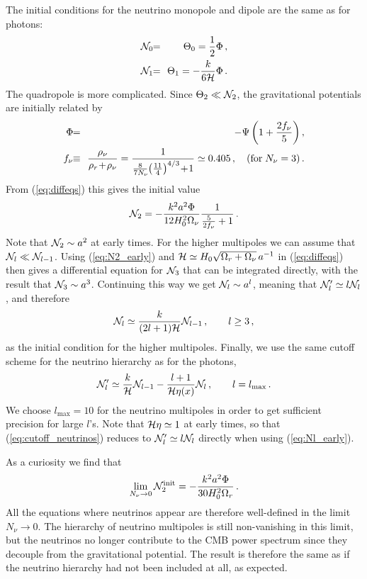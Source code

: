 \documentclass[twocolumn,nofootinbib,amsmath,amssymb]{revtex4}
\newcommand{\be}{\begin{equation}}
\newcommand{\ee}{\end{equation}}
\newcommand{\ba}{\begin{eqnarray}}
\newcommand{\ea}{\end{eqnarray}}
\newcommand{\hs}{\hspace{-1.12mm}}
\newcommand{\eq}{\hs & = & \hs}
\newcommand{\eqequiv}{\hs & \equiv & \hs}
\begin{document}
The initial conditions for the neutrino monopole and dipole are the same as for
photons:
\ba
  {\cal N}_0 \eq \Theta_0 = \frac{1}{2} \Phi \, , \nonumber \\
  {\cal N}_1 \eq \Theta_1 = -\frac{k}{6{\cal H}} \Phi \, .
\ea
The quadropole is more complicated. Since $\Theta_2 \ll {\cal N}_2$, the
gravitational potentials are initially related by~\cite{Dodelson}
\ba
  \Phi \eq -\Psi \left( 1 + \frac{2 f_\nu}{5} \right) , \\
  f_\nu \eqequiv \frac{\rho_\nu}{\rho_r \!+\! \rho_\nu} =
    \frac{1}{\frac{8}{7 N_\nu\!} \!\left( \frac{11}{4} \right)^{4/3} \!+\! 1}
    \simeq 0.405 \, , \quad (\mathrm{for}\; N_\nu = 3) \, . \nonumber
\ea
From (\ref{eq:diffeqs}) this gives the initial value
\be
  {\cal N}_2 = -\frac{k^2 a^2 \Phi}{12 H_0^2 \Omega_\nu}
    \frac{1}{\frac{5}{2 f_\nu} + 1} \, .
  \label{eq:N2_early}
\ee
Note that ${\cal N}_2 \sim a^2$ at early times. For the higher multipoles we
can assume that ${\cal N}_l \ll {\cal N}_{l-1}$. Using (\ref{eq:N2_early}) and
${\cal H} \simeq H_0 \sqrt{\Omega_r+\Omega_\nu} \, a^{-1}$ in
(\ref{eq:diffeqs}) then gives a differential equation for ${\cal N}_3$ that can
be integrated directly, with the result that ${\cal N}_3 \sim a^3$. Continuing
this way we get ${\cal N}_l \sim a^l$, meaning that ${\cal N}'_l \simeq l {\cal
N}_l$, and therefore
\be
  {\cal N}_l \simeq \frac{k}{(2l+1){\cal H}} {\cal N}_{l-1} \, ,
  \qquad l \geq 3 \, ,
  \label{eq:Nl_early}
\ee
as the initial condition for the higher multipoles. Finally, we use the same
cutoff scheme for the neutrino hierarchy as for the photons,
\be
  {\cal N}'_l \simeq \frac{k}{{\cal H}} {\cal N}_{l-1} -
    \frac{l+1}{{\cal H}\eta(x)} {\cal N}_l \, , \qquad l = l_{\max} \, .
  \label{eq:cutoff_neutrinos}
\ee
We choose $l_{\max} = 10$ for the neutrino multipoles in order to get
sufficient precision for large $l$'s. Note that ${\cal H} \eta \simeq 1$ at
early times, so that (\ref{eq:cutoff_neutrinos}) reduces to ${\cal N}'_l \simeq
l {\cal N}_l$ directly when using (\ref{eq:Nl_early}).

As a curiosity we find that
\be
  \lim_{N_\nu \to 0} {\cal N}_2^{\mathrm{init}} =
    -\frac{k^2 a^2 \Phi}{30 H_0^2 \Omega_r} \, .
\ee
All the equations where neutrinos appear are therefore well-defined in the
limit $N_\nu \to 0$. The hierarchy of neutrino multipoles is still
non-vanishing in this limit, but the neutrinos no longer contribute to the CMB
power spectrum since they decouple from the gravitational potential. The result
is therefore the same as if the neutrino hierarchy had not been included at
all, as expected.
\end{document}
